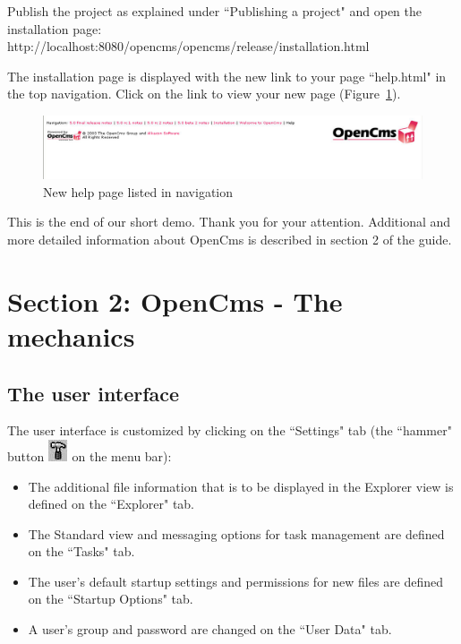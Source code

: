 Publish the project as explained under ``Publishing a project" and
open the installation page:\\
http://localhost:8080/opencms/opencms/release/installation.html

The installation page is displayed with the new link to your page ``help.html" in the top navigation.
Click on the link to
view your new page (Figure~\ref{demopage03}). 

\begin{figure}[!hbt]
\begin{center}
\includegraphics[width=\sgw]
                   {pics/usermanual/demoPage03}
\caption[New help page listed in navigation]
           {New help page listed in navigation}
\label{demopage03}
\end{center}
\end{figure}

This is the end of our short demo. Thank you for your attention. 
Additional and more detailed information about OpenCms is described in section 2 of the guide.

\newpage
\section{Section 2: OpenCms - The mechanics}

\subsection{The user interface}
The user interface is customized by clicking on the ``Settings" tab
(the ``hammer" button \includegraphics{pics/usermanual/ic_settings}
on the menu bar):

\begin{itemize}
\item The additional file information that is to be displayed in the Explorer view is defined on the ``Explorer" tab.
\item The Standard view and messaging options for task management are defined on the ``Tasks" tab.
\item The user's default startup settings and permissions for new files are defined on the ``Startup Options" tab.
\item A user's group and password are changed on the ``User Data" tab.
\end{itemize}

